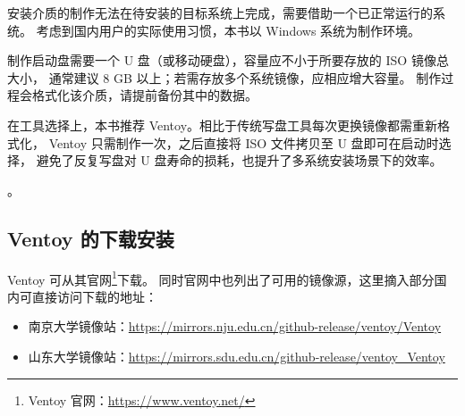 安装介质的制作无法在待安装的目标系统上完成，需要借助一个已正常运行的系统。
考虑到国内用户的实际使用习惯，本书以 Windows 系统为制作环境。

制作启动盘需要一个 U 盘（或移动硬盘），容量应不小于所要存放的 ISO 镜像总大小，
通常建议 8 GB 以上；若需存放多个系统镜像，应相应增大容量。
制作过程会格式化该介质，请提前备份其中的数据。

在工具选择上，本书推荐 Ventoy。相比于传统写盘工具每次更换镜像都需重新格式化，
Ventoy 只需制作一次，之后直接将 ISO 文件拷贝至 U 盘即可在启动时选择，
避免了反复写盘对 U 盘寿命的损耗，也提升了多系统安装场景下的效率。

。

\subsection{Ventoy 的下载安装}

Ventoy 可从其官网\footnote{Ventoy 官网：\url{https://www.ventoy.net/}}下载。
同时官网中也列出了可用的镜像源，这里摘入部分国内可直接访问下载的地址：

\begin{itemize}
  \item 南京大学镜像站：\url{https://mirrors.nju.edu.cn/github-release/ventoy/Ventoy}
  \item 山东大学镜像站：\url{https://mirrors.sdu.edu.cn/github-release/ventoy_Ventoy}
\end{itemize}
